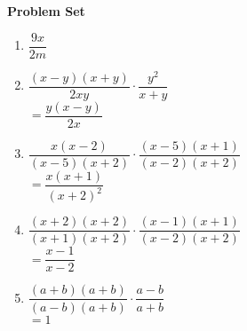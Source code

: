 \textbf{Problem Set}

\vspce



\begin{enumerate}[label = \arabic*. ]

\item%
$\dfrac{9 x}{2 m}$
\item %
$\dfrac{\left(x - y\right) \left(x + y\right)}{2xy} \cdot \dfrac{y^2}{x+y} $\\
$=\dfrac{y \left(x - y\right)}{2 x} $

\item%
$\dfrac{x(x-2)}{\left(x - 5\right) \left(x + 2\right)} \cdot \dfrac{\left(x - 5\right) \left(x + 1\right)}{\left(x - 2\right) \left(x + 2\right)} $\\
$=\dfrac{x \left(x + 1\right)}{\left(x + 2\right)^{2}} $

\item %
$\dfrac{\left(x + 2\right)\left(x + 2\right)}{\left(x + 1\right) \left(x + 2\right)} \cdot \dfrac{\left(x - 1\right) \left(x + 1\right)}{\left(x - 2\right) \left(x + 2\right)} $\\
$=\dfrac{x - 1}{x - 2} $

\item %
$\dfrac{\left(a + b\right)\left(a + b\right)}{\left(a - b\right) \left(a + b\right)} \cdot \dfrac{a-b}{a+b} $\\
$=1 $

\end{enumerate}